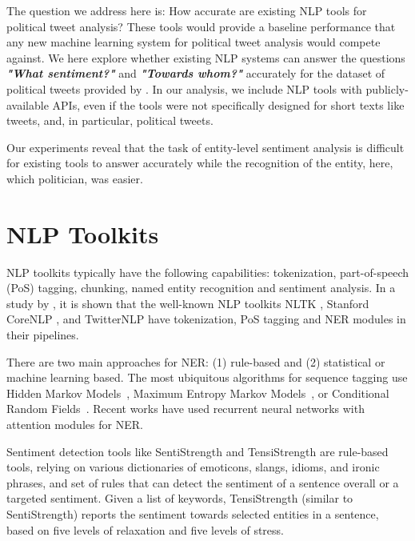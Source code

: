 \documentclass[11pt,a4paper]{article}
\begin{document}
The question we address here is: How accurate are existing NLP tools for  political tweet analysis?  These tools would provide a baseline performance that any new machine learning system for political tweet analysis would compete against.  
We here explore  whether existing NLP systems can answer the questions \textbf{\textit{"What sentiment?"}} and \textbf{\textit{"Towards whom?"}} accurately for the dataset of political tweets provided by \citet{SamekiGeMaGuBe16}. In our analysis, we include NLP tools with publicly-available APIs, even if the tools were not specifically designed for short texts like tweets, and, in particular, political tweets.    

Our experiments reveal that the 
task of entity-level sentiment analysis is difficult for existing tools to answer accurately while the recognition of the entity, here, which politician, was easier.
%





\section{NLP Toolkits}

NLP toolkits typically have the following capabilities: tokenization, part-of-speech (PoS) tagging, chunking, named entity recognition and sentiment analysis. In a study by \citet{PintoOlAl16}, it is shown that the well-known NLP toolkits NLTK \citep{Bird06}, Stanford CoreNLP \citep{ManningSuBaFiBeMc14}, and TwitterNLP \citep{RitterClMaEt11} have tokenization, PoS tagging and NER modules in their pipelines.

There are two main approaches for NER: (1) rule-based and (2) statistical or machine learning based. The most ubiquitous algorithms for sequence tagging use Hidden Markov Models~\citep{JurafskyMa08}, Maximum Entropy Markov Models~\citep{JurafskyMa08, McCallumFrPe00}, or Conditional Random Fields~\citep{SuttonMc12}. Recent works \citep{WangHuZhZh16, ZhangLi17} have used recurrent neural networks with attention modules for NER.


Sentiment detection tools like SentiStrength \citep{ThelwallBuPa10} and TensiStrength \citep{Thelwall17} are rule-based tools, relying on various dictionaries of emoticons,  slangs, idioms, and ironic phrases, and set of rules that can detect the sentiment of a sentence overall or a targeted sentiment. Given a list of keywords, TensiStrength (similar to SentiStrength) reports the sentiment towards selected entities in a sentence, based on five levels of relaxation and five levels of stress. 
\end{document}
